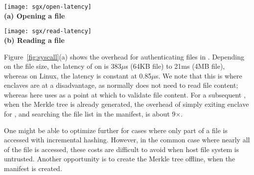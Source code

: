 \begin{figure*}[t!]
\centering
\begin{minipage}{16em}
\centering
\footnotesize
\vspace{6pt}
\texttt{[image: sgx/open-latency]}\\
\vspace{3pt}
{\bf (a) Opening a file}
\vspace{6pt}
\end{minipage}
\hspace{2em}
\begin{minipage}{16em}
\centering
\footnotesize
\vspace{6pt}
\texttt{[image: sgx/read-latency]}\\
\vspace{3pt}
{\bf (b) Reading a file}
\vspace{6pt}
\end{minipage}
\caption{Latency of some expensive system calls in \graphenesgx{}, including opening and reading a secured (authenticated) file, and forking a new process. The results are compared with native Linux and \graphene{}.}
\label{fig:eval:sgx-shield-syscall}
\end{figure*}


Figure~\ref{fig:syscall}(a)
shows the overhead for authenticating files in .
Depending on the file size, the latency of  on \graphenesgx{} is 383$\mu$s (64KB file) to 21ms (4MB file), whereas on Linux, the latency is constant at 0.85$\mu$s.
We note that this is where enclaves are at a disadvantage, as  
normally does not need to read file content; whereas here \graphenesgx{} uses 
as a point at which to validate file content.
For a subsequent , when the Merkle tree is already generated, the overhead of simply exiting enclave for , and searching the file list in the manifest, is about 9$\times$.


One might be able to optimize further for cases where only part of a file is accessed
with incremental hashing.  However, in the common case where nearly all of the file is accessed,
these costs are difficult to avoid when host file system is untrusted.
Another opportunity 
is to create the Merkle tree offline, when the manifest is created.



